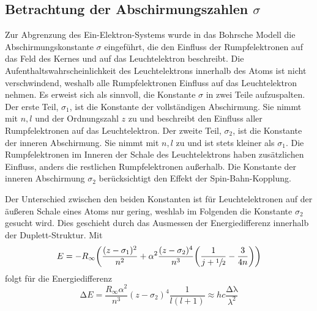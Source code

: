 \subsection{Betrachtung der Abschirmungszahlen \texorpdfstring{$\sigma$}{Sigma}}
Zur Abgrenzung des Ein-Elektron-Systems wurde in das Bohrsche Modell die Abschirmungskonstante $\sigma$ eingeführt, die den Einfluss der Rumpfelektronen auf das Feld des Kernes und auf das Leuchtelektron beschreibt.
Die Aufenthaltswahrscheinlichkeit des Leuchtelektrons innerhalb des Atoms ist nicht verschwindend, weshalb alle Rumpfelektronen Einfluss auf das Leuchtelektron nehmen.
Es erweist sich als sinnvoll, die Konstante $\sigma$ in zwei Teile aufzuspalten.\\
Der erste Teil, $\sigma_1$, ist die Konstante der vollständigen Abschirmung. 
Sie nimmt mit $n,l$ und der Ordnungszahl $z$ zu und beschreibt den Einfluss aller Rumpfelektronen auf das Leuchtelektron.
Der zweite Teil, $\sigma_2$, ist die Konstante der inneren Abschirmung. 
Sie nimmt mit $n,l$ zu und ist stets kleiner als $\sigma_1$.
Die Rumpfelektronen im Inneren der Schale des Leuchtelektrons haben zusätzlichen Einfluss, anders die restlichen Rumpfelektronen außerhalb.
Die Konstante der inneren Abschirmung $\sigma_2$ berücksichtigt den Effekt der Spin-Bahn-Kopplung.

Der Unterschied zwischen den beiden Konstanten ist für Leuchtelektronen auf der äußeren Schale eines Atoms nur gering, weshlab im Folgenden die Konstante $\sigma_2$ gesucht wird.
Dies geschieht durch das Ausmessen der Energiedifferenz innerhalb der Duplett-Struktur.
Mit
\begin{equation}
	E=-R_\infty\biggl(\frac{(z-\sigma_1)^2}{n^2}+\alpha^2\frac{(z-\sigma_2)^4}{n^3}\biggl(\frac{1}{j+\sfrac{1}{2}}-\frac{3}{4n}\biggr) \biggr)
\end{equation}
folgt für die Energiedifferenz
\begin{equation}
	\mathup{\Delta}E=\frac{R_\infty\alpha^2}{n^3}(z-\sigma_2)^4\frac{1}{l(l+1)}\approx hc\frac{\mathup{\Delta\lambda}}{\lambda^2}
\end{equation}

